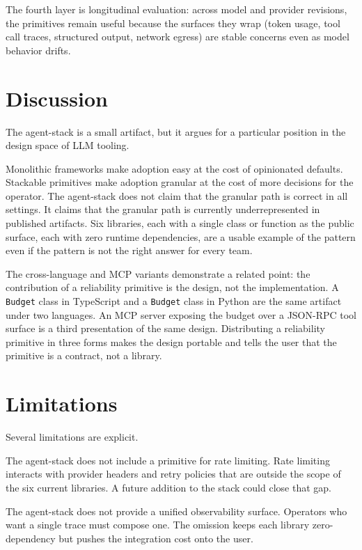\documentclass[11pt]{article}
\begin{document}
The fourth layer is longitudinal evaluation: across model and provider revisions, the primitives remain useful because the surfaces they wrap (token usage, tool call traces, structured output, network egress) are stable concerns even as model behavior drifts.

\section{Discussion}


The agent-stack is a small artifact, but it argues for a particular position in the design space of LLM tooling.

Monolithic frameworks make adoption easy at the cost of opinionated defaults. Stackable primitives make adoption granular at the cost of more decisions for the operator. The agent-stack does not claim that the granular path is correct in all settings. It claims that the granular path is currently underrepresented in published artifacts. Six libraries, each with a single class or function as the public surface, each with zero runtime dependencies, are a usable example of the pattern even if the pattern is not the right answer for every team.

The cross-language and MCP variants demonstrate a related point: the contribution of a reliability primitive is the design, not the implementation. A \texttt{Budget} class in TypeScript and a \texttt{Budget} class in Python are the same artifact under two languages. An MCP server exposing the budget over a JSON-RPC tool surface is a third presentation of the same design. Distributing a reliability primitive in three forms makes the design portable and tells the user that the primitive is a contract, not a library.

\section{Limitations}


Several limitations are explicit.

The agent-stack does not include a primitive for rate limiting. Rate limiting interacts with provider headers and retry policies that are outside the scope of the six current libraries. A future addition to the stack could close that gap.

The agent-stack does not provide a unified observability surface. Operators who want a single trace must compose one. The omission keeps each library zero-dependency but pushes the integration cost onto the user.
\end{document}
